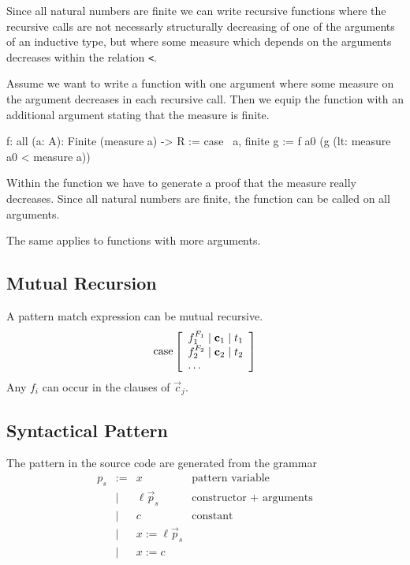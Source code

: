 Since all natural numbers are finite we can write recursive functions where the
recursive calls are not necessarly structurally decreasing of one of the
arguments of an inductive type, but where some measure which depends on the
arguments decreases within the relation \lstinline!<!.

Assume we want to write a function with one argument where some measure on the
argument decreases in each recursive call. Then we equip the function with an
additional argument stating that the measure is finite.
%
\begin{alba}
    f: all (a: A): Finite (measure a) -> R := case
        \ a, finite g :=
            f a0 (g (lt: measure a0 < measure a))
\end{alba}
%
Within the function we have to generate a proof that the measure really
decreases. Since all natural numbers are finite, the function can be called on
all arguments.

The same applies to functions with more arguments.




\subsection{Mutual Recursion}

A pattern match expression can be mutual recursive.
$$
    {\text{case}} \left[ \begin{array}{lllll} 
        f_1^{F_1} \mid {\mathbf c}_1 \mid t_1
        \\
        f_2^{F_2} \mid {\mathbf c}_2 \mid t_2
        \\
        \ldots
     \end{array} \right]
$$
Any $f_i$ can occur in the clauses of $\vec c_j$.





\subsection{Syntactical Pattern}

The pattern in the source code are generated from the grammar
$$
\begin{array}{llll}
    p_s
    &:=&   x                   & \text{pattern variable}
    \\
    &\mid& \ell \vec p_s       & \text{constructor + arguments}
    \\
    &\mid& c                   & \text{constant}
    \\
    &\mid& x := \ell \vec p_s
    \\
    &\mid& x := c
\end{array}
$$


